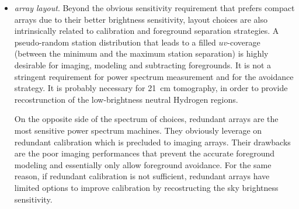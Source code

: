 {\begin{itemize}
\begin{equation}
\end{equation}
Smaller stations have smaller footprints in the $uv$ plane (see Figure~\ref{fig:fig6}) and can, therefore, sample the $uv$ more accurately with respect to larger stations. They also allow to probe smaller $k_\perp$ values (as the minimum possible $uv$ length is essentially the station size) for which the avoidance strategy is more effective (see Figure~\ref{fig:fig2}).
If smaller stations would be preferred for power spectrum measurements, they are generally more challenging in terms of calibration: their wider fields of view require a more accurate sky model for calibration, are more susceptible to ionospheric effects and suffer from a more severe polarization leakge contamination. Given the smaller size, their visibilities have a lower signal-to-noise ratio compared to larger station that can lead to limitations to the calibration of high time variable effects. On the other hand, they do not necessarily require to track sources with a high time cadence but can use drift scan strategies (where they are pointed to a fied direction and the sky drifts overhead) or a mix of drift scan and pointed observations to maximize sensitivity (\cite{trott14}). The advantage of drift scan over pointed observations is that primary beams remain constant in time, avoiding some of the effects described in the Section~\ref{sec:challenges}.

\item {\it array layout}. Beyond the obvious sensitivity requirement that prefers compact arrays due to their better brightness sensitivity, layout choices are also intrinsically related to calibration and foreground separation strategies. A pseudo-random station distribution that leads to a filled $uv$-coverage (between the minimum and the maximum station separation) is highly desirable for imaging, modeling and subtracting foregrounds. It is not a stringent requirement for power spectrum measurement and for the avoidance strategy. It is probably necessary for 21~cm tomography, in order to provide recostrunction of the low-brightness neutral Hydrogen regions.

On the opposite side of the spectrum of choices, redundant arrays are the most sensitive power spectrum machines. They obviously leverage on redundant calibration which is precluded to imaging arrays. Their drawbacks are the poor imaging performances that prevent the accurate foreground modeling and essentially only allow foreground avoidance. For the same reason, if redundant calibration is not sufficient, redundant arrays have limited options to improve calibration by recostructing the sky brightness sensitivity.   
\end{itemize}

}
